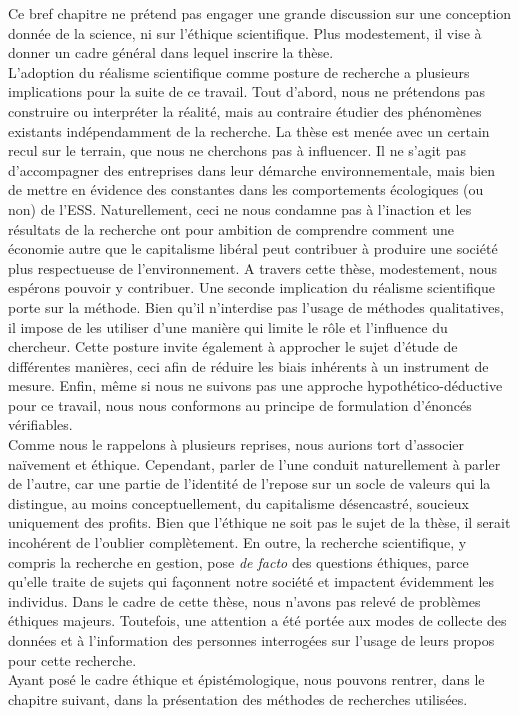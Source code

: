 Ce bref chapitre ne prétend pas engager une grande discussion sur une conception donnée de la science, ni sur l'éthique scientifique. Plus modestement, il vise à donner un cadre général dans lequel inscrire la thèse. \\

L'adoption du réalisme scientifique comme posture de recherche a plusieurs implications pour la suite de ce travail. Tout d'abord, nous ne prétendons pas construire ou interpréter la réalité, mais au contraire étudier des phénomènes existants indépendamment de la recherche. La thèse est menée avec un certain recul sur le terrain, que nous ne cherchons pas à influencer. Il ne s'agit pas d'accompagner des entreprises dans leur démarche environnementale, mais bien de mettre en évidence des constantes dans les comportements écologiques (ou non) de l'ESS. Naturellement, ceci ne nous condamne pas à l'inaction et les résultats de la recherche ont pour ambition  de comprendre comment une économie autre que le capitalisme libéral peut contribuer à produire une société plus respectueuse de l'environnement. A travers cette thèse, modestement, nous espérons pouvoir y contribuer. Une seconde implication du réalisme scientifique porte sur la méthode. Bien qu'il n'interdise pas l'usage de méthodes qualitatives, il impose de les utiliser d'une manière qui limite le rôle et l'influence du chercheur. Cette posture invite également à approcher le sujet d'étude de différentes manières, ceci afin de réduire les biais inhérents à un instrument de mesure. Enfin, même si nous ne suivons pas une approche hypothético-déductive pour ce travail, nous nous conformons au principe de formulation d'énoncés vérifiables. \\

Comme nous le rappelons à plusieurs reprises, nous aurions tort d'associer naïvement \ess et éthique. Cependant, parler de l'une conduit naturellement à parler de l'autre, car une partie de l'identité de l'\ess repose sur un socle de valeurs qui la distingue, au moins conceptuellement, du capitalisme  désencastré, soucieux uniquement des profits. Bien que l'éthique ne soit pas le sujet de la thèse, il serait incohérent de l'oublier complètement. En outre, la recherche scientifique, y compris la recherche en gestion, pose \textit{de facto} des questions éthiques, parce qu'elle traite de sujets qui façonnent notre société et impactent évidemment les individus. Dans le cadre de cette thèse, nous n'avons pas relevé de problèmes éthiques majeurs. Toutefois, une attention a été portée aux modes de collecte des données et à l'information des personnes interrogées sur l'usage de leurs propos pour cette recherche. \\

Ayant posé le cadre éthique et épistémologique, nous pouvons rentrer, dans le chapitre suivant, dans la présentation des méthodes de recherches utilisées.
